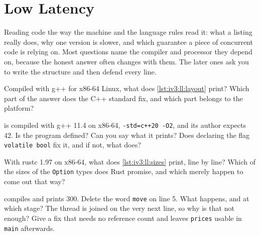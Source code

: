 \chapter{Low Latency}\label{ch:iv3:low-latency}

\begin{ivtrains}
Reading code the way the machine and the language rules read it: what a listing really does, why one version is slower, and which guarantee a piece
of concurrent code is relying on. Most questions name the compiler and processor they depend on, because the honest answer often changes with them. The
later ones ask you to write the structure and then defend every line.
\end{ivtrains}

\begin{question}\label{iq:iv3:low-latency:1}
Compiled with g++ for x86-64 Linux, what does \cref{lst:iv3:ll:layout} print? Which part of the answer does the C++ standard fix, and which part belongs to the platform?
\label{lst:iv3:ll:layout}
\end{question}

\begin{question}\label{iq:iv3:low-latency:2}
 is compiled with g++ 11.4 on x86-64, \texttt{-std=c++20 -O2}, and its author expects 42. Is the program defined? Can you say what it prints? Does declaring the flag \texttt{volatile bool} fix it, and if not, what does?
\label{lst:iv3:ll:spinflag}
\end{question}

\begin{question}\label{iq:iv3:low-latency:3}
With rustc 1.97 on x86-64, what does \cref{lst:iv3:ll:sizes} print, line by line? Which of the sizes of the \texttt{Option} types does Rust promise, and which merely happen to come out that way?
\label{lst:iv3:ll:sizes}
\end{question}

\begin{question}\label{iq:iv3:low-latency:4}
 compiles and prints 300. Delete the word \texttt{move} on line 5. What happens, and at which stage? The thread is joined on the very next line, so why is that not enough? Give a fix that needs no reference count and leaves \texttt{prices} usable in \texttt{main} afterwards.
\label{lst:iv3:ll:spawn}
\end{question}

